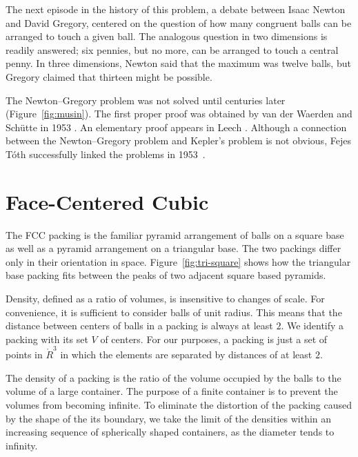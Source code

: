 The next episode in the history of this problem,  a debate between
Isaac Newton and David Gregory,  centered on the
question of how many congruent balls  can be arranged to touch
a given ball.  The analogous question in two dimensions is readily answered;
six pennies, but no more, can be arranged
to touch a central penny.  In three dimensions, Newton said that the maximum was
twelve balls, but Gregory claimed that thirteen might be possible.

The Newton--Gregory problem was not solved until centuries later
(Figure~\ref{fig:musin}).  The first proper proof was obtained by van
der Waerden and Sch\"utte in 1953 \cite{Sch53}.  An elementary proof
appears in Leech \cite{Leech:1956:MG}.  Although a connection between
the Newton--Gregory problem and Kepler's problem is not obvious, Fejes
T\'oth successfully linked the problems in 1953~\cite{Fej53}.

\figPTFTWZM %

\section{Face-Centered Cubic}



The FCC packing is the familiar pyramid arrangement of
balls on a square base as well as a pyramid arrangement on a
triangular base.  The two packings
differ only in their orientation in space.
Figure~\ref{fig:tri-square} shows how the triangular base
packing fits between the peaks of two adjacent square based pyramids.

\figNTNKMGO %

Density, defined as a ratio of volumes, is insensitive to changes of
scale.  For convenience, it is sufficient to consider balls of unit
radius. This means that the distance between centers of balls in a
packing is always  at least $2$.  We identify a packing with its set $V$
of centers.   For our purposes, a packing is just a set of points
in $\ring{R}^3$ in which the elements are separated by distances of at least
$2$.



The density of a packing is the ratio of the volume occupied by the
balls to the volume of a large container.  The
purpose of a finite container is to prevent the volumes from becoming
infinite.  To eliminate the distortion of the packing caused by the
shape of the its boundary, we take the limit of the densities within an increasing
sequence of spherically shaped containers, as the diameter tends to infinity.

